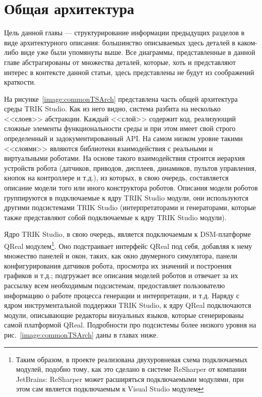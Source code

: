 \documentclass[a5paper]{article}
\begin{document}
\section{Общая архитектура}
\label{chapter:commonArchitecture}

Цель данной главы --- структурирование информации предыдущих разделов в виде архитектурного описания: большинство описываемых здесь деталей в каком-либо виде уже были упомянуты выше. Все диаграммы, представленные в данной главе абстрагированы от множества деталей, которые, хоть и представляют интерес в контексте данной статьи, здесь представлены не будут из соображений краткости.

На рисунке~\ref{image:commonTSArch} представлена часть общей архитектура среды TRIK Studio. Как из него видно, система разбита на несколько <<слоев>> абстракции. Каждый <<слой>> содержит код, реализующий сложные элементы функциональности среды и при этом имеет свой строго определенный и задокументированный API. На самом низком уровне такими <<слоями>> являются библиотеки взаимодействия с реальными и виртуальными роботами. На основе такого взаимодействия строится иерархия устройств робота (датчиков, приводов, дисплеев, динамиков, пультов управления, кнопок на контроллере и т.д.), из которых, в свою очередь, составляется описание модели того или иного конструктора роботов. Описания модели роботов группируются в подключаемые к ядру TRIK Studio модули, они используются другими подсистемами TRIK Studio (интерпретаторами и генераторами, которые также представляют собой подключаемые к ядру TRIK Studio модули).

Ядро TRIK Studio, в свою очередь, является подключаемым к DSM-платформе QReal модулем\footnote{Таким образом, в проекте реализована двухуровневая схема подключаемых модулей, подобно тому, как это сделано в системе ReSharper от компании JetBrains: ReSharper может расширяться подключаемыми модулями, при этом сам является подключаемым к Visual Studio модулем}. Оно подстраивает интерфейс QReal под себя, добавляя к нему множество панелей и окон, таких, как окно двумерного симулятора, панели конфигурирования датчиков робота, просмотра их значений и построения графиков и т.д.; подгружает все описания моделей роботов и отвечает за их рассылку всем необходимым подсистемам, предоставляет пользователю информацию о работе процесса генерации и интерпретации, и т.д. Наряду с ядром инструментальной поддержки TRIK Studio, к ядру QReal подключаются модули, описывающие редакторы визуальных языков, которые сгенерированы самой платформой QReal. Подробности про подсистемы более низкого уровня на рис.~\ref{image:commonTSArch} даны в главах ниже.
\end{document}
